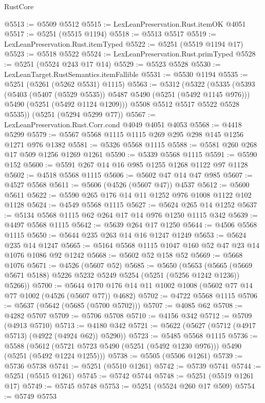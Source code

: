 \begin{lexlean}{RustCore}
\begin{coremodule}
@5513 := @5509 @5512
@5515 := LexLeanPreservation.Rust.itemOK @4051
@5517 := @5251 (@5515 @1194)
@5518 := @5513 @5517
@5519 := LexLeanPreservation.Rust.itemTyped
@5522 := @5251 (@5519 @1194 @17)
@5523 := @5518 @5522
@5524 := LexLeanPreservation.Rust.primTyped
@5528 := @5251 (@5524 @243 @17 @14)
@5529 := @5523 @5528
@5530 := LexLeanTarget.RustSemantics.itemFallible
@5531 := @5530 @1194
@5535 := @5251 (@5261 (@5262 @5531) @1115)
@5563 := @5312
    (@5322
      (@5335
        (@5393
          (@5403 (@5407 (@5529 @5535)) @5487 @5490 (@5251 (@5492 @1145 @976)))
          @5490
          (@5251 (@5492 @1124 @1209)))
        @5508
        @5512
        @5517
        @5522
        @5528
        @5535))
    (@5251 (@5294 @5299 @77))
@5567 := LexLeanPreservation.Rust.Corr.cond @4049 @4051 @4053
@5568 := @4418 @5299
@5579 := @5567 @5568 @1115 @1115 @269 @295 @298 @145 @1256 @1271 @976 @1382
@5581 := @5326 @5568 @1115
@5588 := @5581 @260 @268 @17 @509 @1256 @1269 @1261
@5590 := @5339 @5568 @1115
@5591 := @5590 @152
@5600 := @5591 @267 @14 @16 @985 @1255 @1268 @1122 @97 @1128
@5602 := @4518 @5568 @1115
@5606 := @5602 @47 @14 @47 @985
@5607 := @4527 @5568
@5611 := @5606 (@4526 (@5607 @47)) @4537
@5612 := @5600 @5611
@5622 := @5590 @265 @176 @14 @11 @1252 @976 @1008 @1122 @102 @1128
@5624 := @4549 @5568 @1115
@5627 := @5624 @265 @14 @1252
@5637 := @5134 @5568 @1115 @62 @264 @17 @14 @976 @1250 @1115 @342
@5639 := @4497 @5568 @1115
@5642 := @5639 @264 @17 @1250
@5644 := @4506 @5568 @1115
@5650 := @5644 @235 @263 @14 @16 @1247 @1249
@5653 := @5624 @235 @14 @1247
@5665 := @5164 @5568 @1115 @1047 @160 @52 @47 @23 @14 @1076 @1086 @92 @1242
@5668 := @5602 @52 @158 @52
@5669 := @5668 @1076
@5671 := @4526 (@5607 @52)
@5685 := @5650
    (@5653 (@5665 (@5669 @5671 @5188) @5226 @5232 @5249 @5254 (@5251 (@5256 @1242 @1236)) @5266))
@5700 := @5644 @170 @176 @14 @11 @1002 @1008 (@5602 @77 @14 @77 @1002 (@4526 (@5607 @77)) @4682)
@5702 := @4722 @5568 @1115
@5706 := @5637 (@5642 (@5685 (@5700 @5702)))
@5707 := @4085 @62
@5708 := @4282 @5707
@5709 := @5706 @5708
@5710 := @4156 @342
@5712 := @5709 (@4913 @5710)
@5713 := @4180 @342
@5721 := @5622 (@5627 (@5712 (@4917 @5713) (@4922 (@4924 @62)) @5290))
@5723 := @5485 @5568 @1115
@5736 := @5588
    (@5612 (@5721 @5723 @5490 (@5251 (@5492 @1230 @976))) @5490 (@5251 (@5492 @1224 @1255)))
@5738 := @5505 (@5506 @1261)
@5739 := @5736 @5738
@5741 := @5251 (@5510 @1261)
@5742 := @5739 @5741
@5744 := @5251 (@5515 @1261)
@5745 := @5742 @5744
@5748 := @5251 (@5519 @1261 @17)
@5749 := @5745 @5748
@5753 := @5251 (@5524 @260 @17 @509)
@5754 := @5749 @5753

\end{coremodule}
\end{lexlean}
